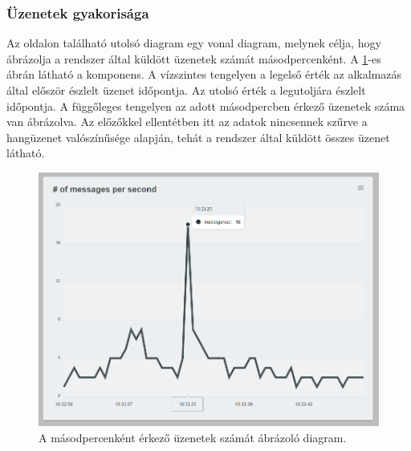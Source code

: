 \subsubsection{Üzenetek gyakorisága}
Az oldalon található utolsó diagram egy vonal diagram, melynek célja, hogy ábrázolja a rendszer által küldött üzenetek számát másodpercenként.
A \ref{fig:dashboard-messages-line}-es ábrán látható a komponens.
A vízszintes tengelyen a legelső érték az alkalmazás által először észlelt üzenet időpontja.
Az utolsó érték a legutoljára észlelt időpontja.
A függőleges tengelyen az adott másodpercben érkező üzenetek száma van ábrázolva.
Az előzőkkel ellentétben itt az adatok nincsennek szűrve a hangüzenet valószínűsége alapján,
tehát a rendszer által küldött összes üzenet látható.
\begin{figure}[!ht]
    \centering
    \includegraphics[width=150mm, keepaspectratio]{figures/dashboard-line-messages.png}
    \caption{A másodpercenként érkező üzenetek számát ábrázoló diagram.}
    \label{fig:dashboard-messages-line}
\end{figure}
\newpage

